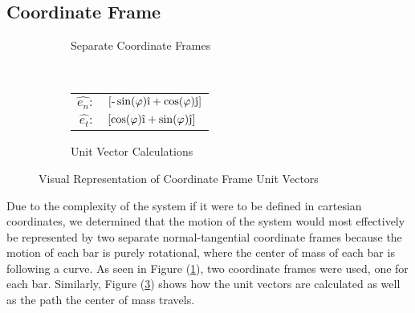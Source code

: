 \documentclass[12pt]{report}
\begin{document}
\begin{flushleft}
\section{Coordinate Frame}
\begin{figure}[ht]
    \begin{subfigure}[t]{.5\textwidth}
      \center
      \caption{Separate Coordinate Frames}
      \label{coord:a}
      
      \vspace{2ex}
    \end{subfigure}%
\begin{subfigure}[t]{.5\textwidth}
      \center
      \caption{Unit Vector Calculations}
      \label{coord:b}
       \\
      \begin{tabular}{rl}
        $\hat{e_n}:$ & $\left[\textrm{-}\sin(\varphi)\hat{\textrm{\i}}+\cos(\varphi)\hat{\textrm{\j}}\right]$ \\
        $\hat{e_t}:$ & $\left[\cos(\varphi)\hat{\textrm{\i}}+\sin(\varphi)\hat{\textrm{\j}}\right]$ \\
      \end{tabular}
    \end{subfigure}
    \caption{Visual Representation of Coordinate Frame Unit Vectors}
\end{figure}
Due to the complexity of the system if it were to be defined in cartesian coordinates,
we determined that the motion of the system would most effectively be represented by two separate
normal-tangential coordinate frames because the motion of each bar is purely rotational, where the
center of mass of each bar is following a curve. As seen in Figure (\ref{coord:a}), two coordinate
frames were used, one for each bar. Similarly, Figure (\ref{coord:b}) shows how the
unit vectors are calculated as well as the path the center of mass travels.
\newpage


\end{flushleft}
\end{document}

